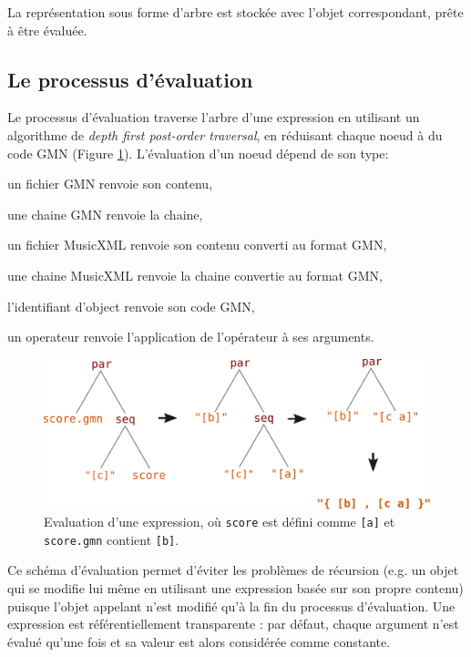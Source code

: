 \documentclass{article}
\newcommand{\OSC}[1]{\texttt{#1}}
\let\olditemize\itemize
\let\oldenditemize\enditemize
\renewenvironment{itemize} 	{\olditemize \setlength{\itemsep}{1mm}}{\oldenditemize}
\begin{document}
La représentation sous forme d'arbre est stockée avec l'objet correspondant, prête à être évaluée.

\subsection{Le processus d'évaluation}
Le processus d'évaluation traverse l'arbre d'une expression en utilisant un algorithme de \textit{depth first post-order traversal}, en réduisant chaque noeud à du code GMN (Figure \ref{fig:classicEval}).
L'évaluation d'un noeud dépend de son type:
\begin{itemize}
\item un fichier GMN renvoie son contenu,
\item une chaine GMN renvoie la chaine,
\item un fichier MusicXML renvoie son contenu converti au format GMN,
\item une chaine MusicXML renvoie la chaine convertie au format GMN,
\item l'identifiant d'object renvoie son code GMN,
\item un operateur renvoie l'application de l'opérateur à ses arguments.
\end{itemize}

\begin{figure}[th]
\centering
\includegraphics[width=1\columnwidth]{imgs/classicEval}
\caption{Evaluation d'une expression,
où \OSC{score} est défini comme \OSC{[a]}
et \OSC{score.gmn} contient \OSC{[b]}.
\label{fig:classicEval} }
\end{figure}

Ce schéma d'évaluation permet d'éviter les problèmes de récursion (e.g. un objet qui se modifie lui même en utilisant une expression basée sur son propre contenu) puisque l'objet appelant n'est modifié qu'à la fin du processus d'évaluation. 
Une expression est référentiellement transparente : par défaut, chaque argument n'est évalué qu'une fois et sa valeur est alors considérée comme constante.
\end{document}
